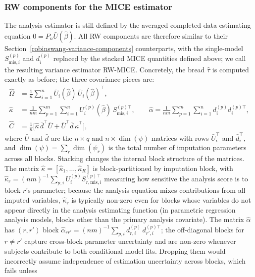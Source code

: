 \subsubsection{RW components for the MICE estimator}
The analysis estimator is still defined by the averaged completed-data
estimating equation \(0=P_n\bar U(\hat\beta)\).  All RW components are
therefore similar to their Section~\ref{robinswang-variance-components}
counterparts, with the single-model \(S_{\mathrm{mis},i}^{(p)}\) and
\(d_i^{(p)}\) replaced by the stacked MICE quantities defined above; we
call the resulting variance estimator RW-MICE.
Concretely, the bread \(\hat\tau\) is computed exactly as before; the
three covariance pieces are:
\begin{align*}
\widehat\Omega
&=
\frac{1}{n}\sum_{i=1}^n \bar U_i(\hat\beta)\,\bar U_i(\hat\beta)^\top,
\\[4pt]
\widehat\kappa
&=
\frac{1}{nm}\sum_{p=1}^m\sum_{i=1}^n
U_i^{(p)}(\hat\beta)\,S_{\mathrm{mis},i}^{(p)\top},
\qquad
\widehat\alpha
=
\frac{1}{nm}\sum_{p=1}^m\sum_{i=1}^n
d_i^{(p)}d_i^{(p)\top},
\\[4pt]
\widehat C
&=
\frac{1}{n}
\bigl[
\widehat\kappa\,\bar d^\top \bar U
+
\bar U^\top\bar d\,\widehat\kappa^\top
\bigr],
\end{align*}
where \(\bar U\) and \(\bar d\) are the \(n\times q\) and
\(n\times\dim(\psi)\) matrices with rows \(\bar U_i^\top\) and
\(\bar d_i^\top\), and \(\dim(\psi)=\sum_r\dim(\psi_r)\) is the total
number of imputation parameters across all blocks.
Stacking changes the internal block structure of the matrices.
The matrix \(\widehat\kappa = [\widehat\kappa_1,\ldots,\widehat\kappa_R]\)
is block-partitioned by imputation block, with
\(\widehat\kappa_r = (nm)^{-1}\sum_{p,i}U_i^{(p)}S_{r,\mathrm{mis},i}^{(p)\top}\)
measuring how sensitive the analysis score is to block \(r\)'s parameter;
because the analysis equation mixes contributions from all imputed
variables, \(\widehat\kappa_r\) is typically non-zero even for blocks
whose variables do not appear directly in the analysis estimating
function (in parametric regression analysis models, blocks other than
the primary analysis covariate).  The matrix
\(\widehat\alpha\) has \((r,r')\) block
\(\widehat\alpha_{rr'} = (nm)^{-1}\sum_{p,i}d_{r,i}^{(p)}\,d_{r',i}^{(p)\top}\);
the off-diagonal blocks for \(r\neq r'\) capture cross-block parameter
uncertainty and are non-zero whenever subjects contribute to both
conditional model fits.  Dropping them would incorrectly assume
independence of estimation uncertainty across blocks, which fails unless
